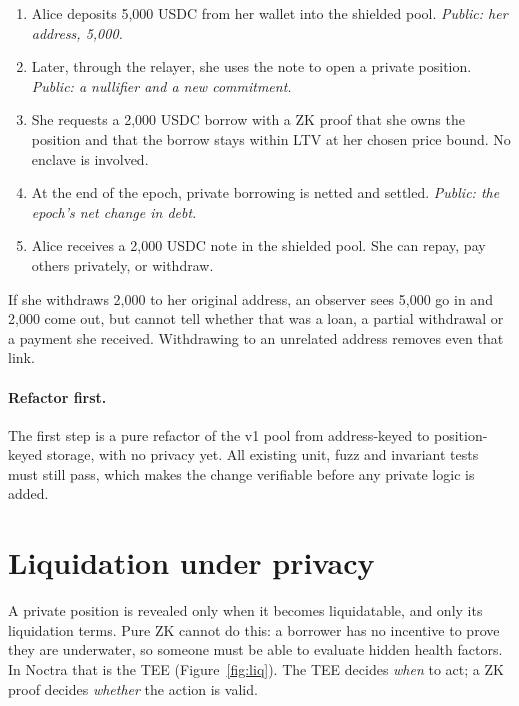 \documentclass[11pt,a4paper]{article}
\begin{document}
\begin{enumerate}
  \item Alice deposits 5,000 USDC from her wallet into the shielded pool. \emph{Public: her address, 5,000.}
  \item Later, through the relayer, she uses the note to open a private position. \emph{Public: a nullifier and a
        new commitment.}
  \item She requests a 2,000 USDC borrow with a ZK proof that she owns the position and that the borrow stays
        within LTV at her chosen price bound. No enclave is involved.
  \item At the end of the epoch, private borrowing is netted and settled. \emph{Public: the epoch's net change in
        debt.}
  \item Alice receives a 2,000 USDC note in the shielded pool. She can repay, pay others privately, or withdraw.
\end{enumerate}
If she withdraws 2,000 to her original address, an observer sees 5,000 go in and 2,000 come out, but cannot tell
whether that was a loan, a partial withdrawal or a payment she received. Withdrawing to an unrelated address
removes even that link.

\paragraph{Refactor first.} The first step is a pure refactor of the v1 pool from address-keyed to position-keyed storage, with no privacy
yet. All existing unit, fuzz and invariant tests must still pass, which makes the change verifiable before any
private logic is added.

\section{Liquidation under privacy}

A private position is revealed only when it becomes liquidatable, and only its liquidation terms. Pure ZK cannot
do this: a borrower has no incentive to prove they are underwater, so someone must be able to evaluate hidden
health factors. In Noctra that is the TEE (Figure~\ref{fig:liq}). The TEE decides \emph{when} to act; a ZK
proof decides \emph{whether} the action is valid.
\end{document}
